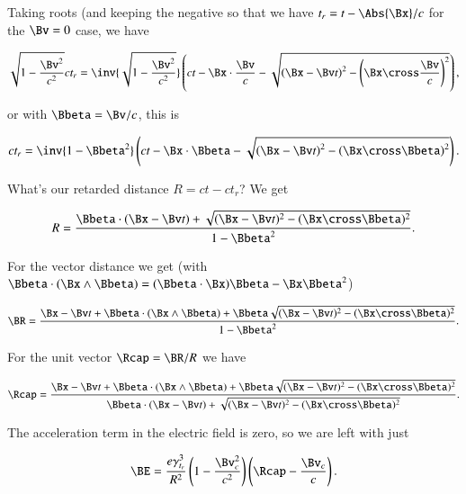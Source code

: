 Taking roots (and keeping the negative so that we have $t_r = t - \Abs{\Bx}/c$ for the $\Bv = 0$ case, we have

\begin{equation}\label{eqn:relElectroDynProblemSet5:670}
\sqrt{1 - \frac{\Bv^2}{c^2}} c t_r 
=
\inv{\sqrt{1 - \frac{\Bv^2}{c^2}}} \left(
c t - \Bx \cdot \frac{\Bv}{c} - \sqrt{ \left( \Bx - \Bv t \right)^2 - \left(\Bx \cross \frac{\Bv}{c}\right)^2 }
\right),
\end{equation}

or with $\Bbeta = \Bv/c$, this is

\begin{equation}\label{eqn:relElectroDynProblemSet5:690}
c t_r = \inv{1 - \Bbeta^2} \left( c t - \Bx \cdot \Bbeta - \sqrt{ \left( \Bx - \Bv t \right)^2 - \left(\Bx \cross \Bbeta\right)^2 } \right).
\end{equation}

What's our retarded distance $R = c t - c t_r$?  We get

\begin{equation}\label{eqn:relElectroDynProblemSet5:710}
R = \frac{\Bbeta \cdot (\Bx - \Bv t) + \sqrt{ (\Bx - \Bv t)^2 - (\Bx \cross \Bbeta)^2 }}{ 1 - \Bbeta^2 }.
\end{equation}

For the vector distance we get (with $\Bbeta \cdot (\Bx \wedge \Bbeta) = (\Bbeta \cdot \Bx) \Bbeta - \Bx \Bbeta^2$)

\begin{equation}\label{eqn:relElectroDynProblemSet5:730}
\BR = \frac{\Bx -\Bv t + \Bbeta \cdot (\Bx \wedge \Bbeta) + \Bbeta \sqrt{ (\Bx - \Bv t)^2 - (\Bx \cross \Bbeta)^2 }}{ 1 - \Bbeta^2 }.
\end{equation}

For the unit vector $\Rcap = \BR/R$ we have

\begin{equation}\label{eqn:relElectroDynProblemSet5:750}
\Rcap = \frac{\Bx - \Bv t + \Bbeta \cdot (\Bx \wedge \Bbeta) + \Bbeta \sqrt{ (\Bx - \Bv t)^2 - (\Bx \cross \Bbeta)^2 }}{ 
\Bbeta \cdot (\Bx - \Bv t) + \sqrt{ (\Bx - \Bv t)^2 - (\Bx \cross \Bbeta)^2 } 
}.
\end{equation}

The acceleration term in the electric field is zero, so we are left with just

\begin{equation}\label{eqn:relElectroDynProblemSet5:770}
\BE
= 
\frac{e \gamma_{t_r}^3}{R^2} 
\left( 1 - \frac{\Bv_c^2}{c^2} \right) 
\left( \Rcap - \frac{\Bv_c}{c} \right).
\end{equation}

